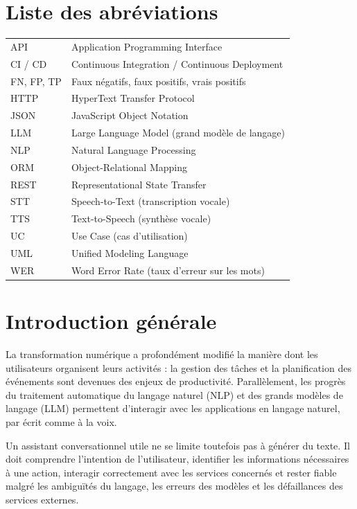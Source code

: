 \documentclass[11pt,a4paper,openany,oneside]{report}
\begin{document}
\chapter*{Liste des abr\'eviations}
\begin{tabular}{@{}p{2.6cm}p{12cm}@{}}
API & Application Programming Interface \\
CI / CD & Continuous Integration / Continuous Deployment \\
FN, FP, TP & Faux n\'egatifs, faux positifs, vrais positifs \\
HTTP & HyperText Transfer Protocol \\
JSON & JavaScript Object Notation \\
LLM & Large Language Model (grand mod\`ele de langage) \\
NLP & Natural Language Processing \\
ORM & Object-Relational Mapping \\
REST & Representational State Transfer \\
STT & Speech-to-Text (transcription vocale) \\
TTS & Text-to-Speech (synth\`ese vocale) \\
UC & Use Case (cas d'utilisation) \\
UML & Unified Modeling Language \\
WER & Word Error Rate (taux d'erreur sur les mots) \\
\end{tabular}

\cleardoublepage
{}
\setcounter{page}{1}
\chapter*{Introduction générale}

La transformation numérique a profondément modifié la manière dont les utilisateurs organisent leurs activités : la gestion des tâches et la planification des événements sont devenues des enjeux de productivité. Parallèlement, les progrès du traitement automatique du langage naturel (NLP) et des grands modèles de langage (LLM) permettent d'interagir avec les applications en langage naturel, par écrit comme à la voix.

Un assistant conversationnel utile ne se limite toutefois pas à générer du texte. Il doit comprendre l'intention de l'utilisateur, identifier les informations nécessaires à une action, interagir correctement avec les services concernés et rester fiable malgré les ambiguïtés du langage, les erreurs des modèles et les défaillances des services externes.
\end{document}
